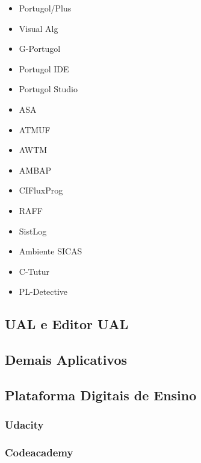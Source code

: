 \begin{itemize}

\item Portugol/Plus

\item Visual Alg

\item G-Portugol

\item Portugol IDE

\item Portugol Studio

\item ASA

\item ATMUF

\item AWTM

\item AMBAP

\item CIFluxProg

\item RAFF

\item SistLog

\item Ambiente SICAS

\item C-Tutur

\item PL-Detective

\end{itemize}

\subsection{UAL e Editor UAL}

\subsection{Demais Aplicativos}

\subsection{Plataforma Digitais de Ensino}

\subsubsection{Udacity}

\subsubsection{Codeacademy}

